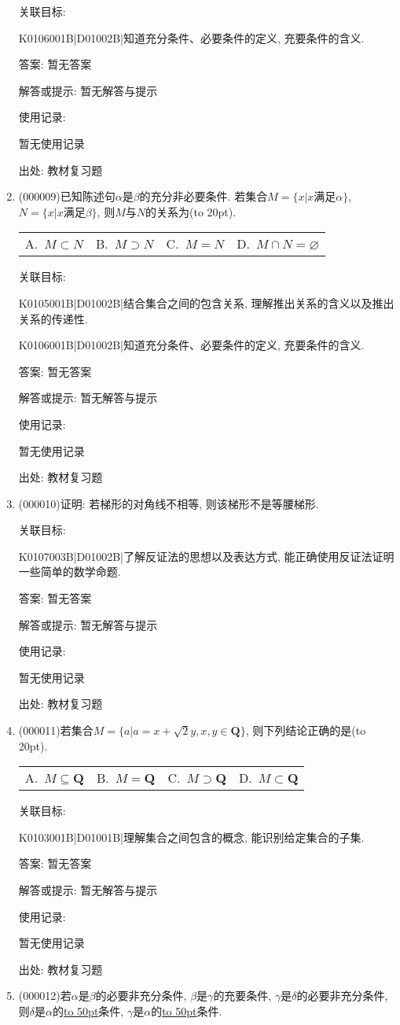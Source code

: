 \documentclass[10pt,a4paper]{article}
\newcommand{\blank}[1]{\underline{\hbox to #1pt{}}}
\newcommand{\bracket}[1]{(\hbox to #1pt{})}
\newcommand{\fourch}[4]{\par\begin{tabular}{p{.23\textwidth}p{.23\textwidth}p{.23\textwidth}p{.23\textwidth}}
A.~#1 &B.~#2& C.~#3& D.~#4
\end{tabular}}
\begin{document}
\begin{enumerate}[1.]
关联目标:

K0106001B|D01002B|知道充分条件、必要条件的定义, 充要条件的含义.

答案: 暂无答案

解答或提示: 暂无解答与提示

使用记录:

暂无使用记录


出处: 教材复习题
\item { (000009)}已知陈述句$\alpha$是$\beta$的充分非必要条件. 若集合$M=\{x|x\text{满足}\alpha\}$, $N=\{x|x\text{满足}\beta\}$, 则$M$与$N$的关系为\bracket{20}.
\fourch{$M\subset N$}{$M\supset N$}{$M=N$}{$M\cap N=\varnothing$}


关联目标:

K0105001B|D01002B|结合集合之间的包含关系, 理解推出关系的含义以及推出关系的传递性.

K0106001B|D01002B|知道充分条件、必要条件的定义, 充要条件的含义.

答案: 暂无答案

解答或提示: 暂无解答与提示

使用记录:

暂无使用记录


出处: 教材复习题
\item { (000010)}证明: 若梯形的对角线不相等, 则该梯形不是等腰梯形.


关联目标:

K0107003B|D01002B|了解反证法的思想以及表达方式, 能正确使用反证法证明一些简单的数学命题.

答案: 暂无答案

解答或提示: 暂无解答与提示

使用记录:

暂无使用记录


出处: 教材复习题
\item { (000011)}若集合$M=\{a|a=x+\sqrt2y, x,y\in \mathbf{Q}\}$, 则下列结论正确的是\bracket{20}.
\fourch{$M\subseteq \mathbf{Q}$}{$M=\mathbf{Q}$}{$M\supset \mathbf{Q}$}{$M\subset \mathbf{Q}$}


关联目标:

K0103001B|D01001B|理解集合之间包含的概念, 能识别给定集合的子集.

答案: 暂无答案

解答或提示: 暂无解答与提示

使用记录:

暂无使用记录


出处: 教材复习题
\item { (000012)}若$\alpha$是$\beta$的必要非充分条件, $\beta$是$\gamma$的充要条件, $\gamma$是$\delta$的必要非充分条件, 则$\delta$是$\alpha$的\blank{50}条件, $\gamma$是$\alpha$的\blank{50}条件.



\end{enumerate}
\end{document}

